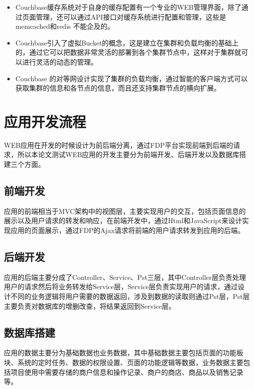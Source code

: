 \begin{itemize}

\item Couchbase缓存系统对于自身的缓存配置有一个专业的WEB管理界面，除了通过页面管理，还可以通过API接口对缓存系统进行配置和管理，这些是memcached和redis 不能企及的。
\item Couchbase引入了虚拟Bucket的概念，这是建立在集群和负载均衡的基础上的，通过它可以把数据非常灵活的部署到各个集群节点中，这样对于集群就可以进行灵活的动态的管理。
\item Couchbase 的对等网设计实现了集群的负载均衡，通过智能的客户端方式可以获取集群的信息和各节点的信息，而且还支持集群节点的横向扩展。

\end{itemize}

\section{应用开发流程}

WEB应用在开发的时候设计为前后端分离，通过FDP平台实现前端到后端的请求，所以本论文测试WEB应用的开发主要分为前端开发、后端开发以及数据库搭建三个方面。

\subsection{前端开发}

应用的前端相当于MVC架构中的视图层，主要实现用户的交互，包括页面信息的展示以及用户请求的转发和响应，在前端开发中，通过Html和JavaScript来设计实现应用的页面展示，通过FDP的Ajax请求将前端的用户请求转发到应用的后端。
\subsection{后端开发}

应用的后端主要分成了Controller、Service、Pst三层，其中Controller层负责处理用户的请求然后将业务转发给Service层，Service层负责实现用户的请求，通过设计不同的业务逻辑将用户需要的数据返回，涉及到数据的读取则通过Pst层，Pst层主要负责对数据库的增删改查，将结果返回到Service层。

\subsection{数据库搭建}

应用的数据主要分为基础数据也业务数据，其中基础数据主要包括页面的功能板块、系统的定时任务、数据的权限设置、页面的功能逻辑等数据，业务数据主要包括项目使用中需要存储的商户信息和操作记录、商户的商店、商品以及销售记录等。

